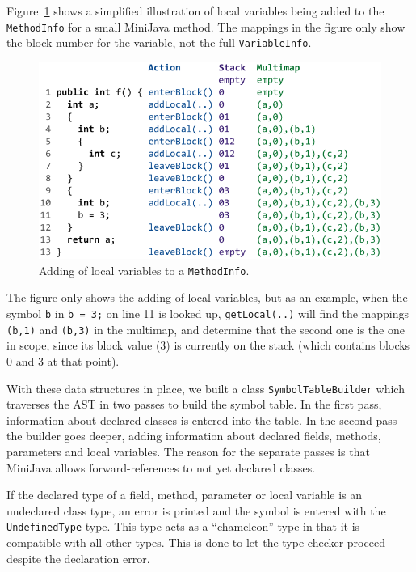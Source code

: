\documentclass[a4paper,11pt]{article}
\begin{document}
Figure~\ref{fig:locals} shows a simplified illustration of local variables being
added to the \texttt{MethodInfo} for a small MiniJava method. The mappings in the
figure only show the block number for the variable, not the full \texttt{VariableInfo}.

\begin{figure}[h!]
    \centering
    \includegraphics{figures/locals.pdf}
    \caption{Adding of local variables to a \texttt{MethodInfo}.}
    \label{fig:locals}
\end{figure}

The figure only shows the adding of local variables, but as an example, when the
symbol \texttt{b} in \lstinline{b = 3;} on line 11 is looked up, \texttt{getLocal(..)}
will find the mappings \texttt{(b,1)} and \texttt{(b,3)} in the multimap, and determine
that the second one is the one in scope, since its block value (3) is currently on the
stack (which contains blocks 0 and 3 at that point).

With these data structures in place, we built a class \texttt{SymbolTableBuilder}
which traverses the AST in two passes to build the symbol table. In the first pass,
information about declared classes is entered into the table. In the second pass the
builder goes deeper, adding information about declared fields, methods, parameters
and local variables. The reason for the separate passes is that MiniJava allows
forward-references to not yet declared classes.

If the declared type of a field, method, parameter or local variable is an undeclared
class type, an error is printed and the symbol is entered with the \texttt{UndefinedType}
type. This type acts as a ``chameleon'' type in that it is compatible with all other
types. This is done to let the type-checker proceed despite the declaration error.
\end{document}
